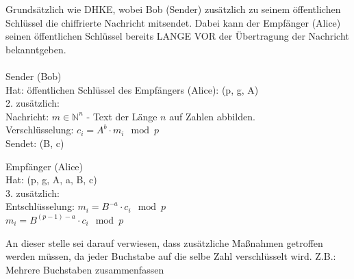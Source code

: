 \documentclass[
  a4paper,
  11pt,
]{article}
\begin{document}
Grundsätzlich wie DHKE, wobei Bob (Sender) zusätzlich zu seinem öffentlichen Schlüssel die chiffrierte Nachricht mitsendet. Dabei kann der Empfänger (Alice)
seinen öffentlichen Schlüssel bereits LANGE VOR der Übertragung der Nachricht bekanntgeben.\\\\

Sender (Bob)\\
Hat: öffentlichen Schlüssel des Empfängers (Alice): (p, g, A)\\
2.	zusätzlich:\\
	Nachricht: ${m\in \mathbb{N}^n}$ - Text der Länge $n$ auf Zahlen abbilden.\\
	Verschlüsselung:	$c_i=A^b\cdot m_i\mod p$\\
	Sendet:	(B, c)

Empfänger (Alice)\\
Hat: (p, g, A, a, B, c)\\
3.	zusätzlich:\\
	Entschlüsselung:	$m_i=B^{-a}\cdot c_i\mod p$\\
	$m_i=B^{(p-1)-a}\cdot c_i\mod p$
	
An dieser stelle sei darauf verwiesen, dass zusätzliche Maßnahmen getroffen werden müssen, da jeder Buchstabe auf die selbe Zahl verschlüsselt wird.
Z.B.: Mehrere Buchstaben zusammenfassen
\end{document}
